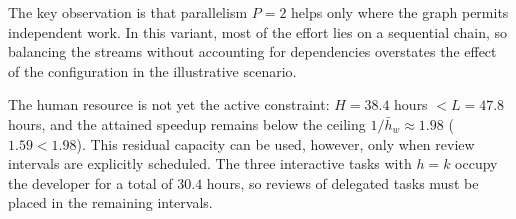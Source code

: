 The key observation is that parallelism $P = 2$ helps only where the graph
permits independent work. In this variant, most of the effort lies on a
sequential chain, so balancing the streams without accounting for dependencies
overstates the effect of the configuration in the illustrative scenario.

The human resource is not yet the active constraint: $H = 38.4$ hours
$< L = 47.8$ hours, and the attained speedup remains below the ceiling
$1/\bar{h}_w \approx 1.98$ ($1.59 < 1.98$). This residual capacity can be used,
however, only when review intervals are explicitly scheduled. The three
interactive tasks with $h = k$ occupy the developer for a total of $30.4$
hours, so reviews of delegated tasks must be placed in the remaining
intervals.
